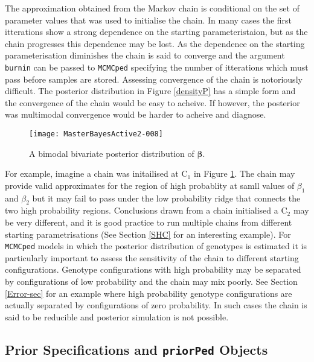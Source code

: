 \documentclass{article}
\begin{document}
The approximation obtained from the Markov chain is conditional on the set of parameter values that was used to initialise the chain.  In many cases the first itterations show a strong dependence on the starting parameteristaion, but as the chain progresses this dependence may be lost.  As the dependence on the starting parameterisation diminishes the chain is said to converge and the argument \texttt{burnin} can be passed to \texttt{MCMCped} specifying the number of itterations which must pass before samples are stored.  Assessing convergence of the chain is notoriously difficult.  The posterior distribution in Figure \ref{densityP} has a simple form and the convergence of the chain would be easy to acheive.  If however, the posterior was multimodal convergence would be harder to acheive and diagnose.\\  
 


\begin{figure}[!h]
\begin{center}
\texttt{[image: MasterBayesActive2-008]}
\end{center}
\caption{A bimodal bivariate posterior distribution of $\bm{\beta}$.}
\label{densityPMM}
\end{figure}

For example, imagine a chain was initailised at $\textrm{C}_{1}$ in Figure \ref{densityPMM}. The chain may provide valid approximates for the region of high probablity at samll values of $\beta_{1}$ and $\beta_{2}$ but it may 
fail to pass under the low probability ridge that connects the two high probability regions.  Conclusions drawn from a chain initialised a $\textrm{C}_{2}$ may be very different, and it is good practice to run multiple chains from different starting parametrisations (See Section \ref{SHC} for an interesting example).  For \texttt{MCMCped} models in which the posterior distribution of genotypes is estimated it is particularly important to assess the sensitivity of the chain to different starting configurations.  Genotype configurations with high probability may be separated by configurations of low probability and the chain may mix poorly.  See Section \ref{Error-sec} for an example where high probability genotype configurations are actually separated by configurations of zero probability.  In such cases the chain is said to be reducible and posterior simulation is not possible.

\subsection{Prior Specifications and \texttt{priorPed} Objects}
\label{prior-sec}
\end{document}
